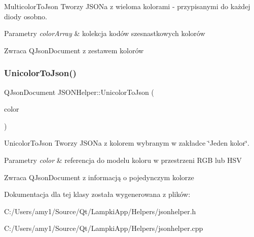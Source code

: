 Multicolor\+To\+Json Tworzy J\+S\+O\+Na z wieloma kolorami -\/ przypisanymi do każdej diody osobno. 


\begin{DoxyParams}{Parametry}
{\em color\+Array} & kolekcja kodów szesnastkowych kolorów \\
\hline
\end{DoxyParams}
\begin{DoxyReturn}{Zwraca}
Q\+Json\+Document z zestawem kolorów 
\end{DoxyReturn}
\mbox{\label{class_j_s_o_n_helper_a4d4771c06547925f86cd02abba8af913}} 
\subsubsection{\texorpdfstring{Unicolor\+To\+Json()}{UnicolorToJson()}}
{\footnotesize\ttfamily Q\+Json\+Document J\+S\+O\+N\+Helper\+::\+Unicolor\+To\+Json (\begin{DoxyParamCaption}\item[{\mbox{\hyperlink{class_a_color_model}{A\+Color\+Model}} \&}]{color }\end{DoxyParamCaption})}



Unicolor\+To\+Json Tworzy J\+S\+O\+Na z kolorem wybranym w zakładce \char`\"{}\+Jeden kolor\char`\"{}. 


\begin{DoxyParams}{Parametry}
{\em color} & referencja do modelu koloru w przestrzeni R\+GB lub H\+SV \\
\hline
\end{DoxyParams}
\begin{DoxyReturn}{Zwraca}
Q\+Json\+Document z informacją o pojedynczym kolorze 
\end{DoxyReturn}


Dokumentacja dla tej klasy została wygenerowana z plików\+:\begin{DoxyCompactItemize}
\item 
C\+:/\+Users/amy1/\+Source/\+Qt/\+Lampki\+App/\+Helpers/jsonhelper.\+h\item 
C\+:/\+Users/amy1/\+Source/\+Qt/\+Lampki\+App/\+Helpers/jsonhelper.\+cpp\end{DoxyCompactItemize}
